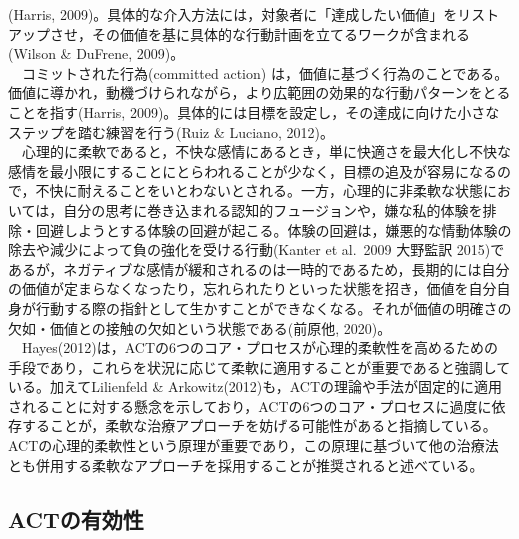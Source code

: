 \documentclass[12pt,a4paper,xelatex,ja=standard]{bxjsarticle}
\begin{document}
(Harris,
2009)。具体的な介入方法には，対象者に「達成したい価値」をリストアップさせ，その価値を基に具体的な行動計画を立てるワークが含まれる(Wilson
\& DuFrene, 2009)。\\
　コミットされた行為(committed action)
は，価値に基づく行為のことである。価値に導かれ，動機づけられながら，より広範囲の効果的な行動パターンをとることを指す(Harris,
2009)。具体的には目標を設定し，その達成に向けた小さなステップを踏む練習を行う(Ruiz
\& Luciano, 2012)。\\
　心理的に柔軟であると，不快な感情にあるとき，単に快適さを最大化し不快な感情を最小限にすることにとらわれることが少なく，目標の追及が容易になるので，不快に耐えることをいとわないとされる。一方，心理的に非柔軟な状態においては，自分の思考に巻き込まれる認知的フュージョンや，嫌な私的体験を排除・回避しようとする体験の回避が起こる。体験の回避は，嫌悪的な情動体験の除去や減少によって負の強化を受ける行動(Kanter
et al.~2009 大野監訳
2015)であるが，ネガティブな感情が緩和されるのは一時的であるため，長期的には自分の価値が定まらなくなったり，忘れられたりといった状態を招き，価値を自分自身が行動する際の指針として生かすことができなくなる。それが価値の明確さの欠如・価値との接触の欠如という状態である(前原他,
2020)。\\
　Hayes(2012)は，ACTの6つのコア・プロセスが心理的柔軟性を高めるための手段であり，これらを状況に応じて柔軟に適用することが重要であると強調している。加えてLilienfeld
\&
Arkowitz(2012)も，ACTの理論や手法が固定的に適用されることに対する懸念を示しており，ACTの6つのコア・プロセスに過度に依存することが，柔軟な治療アプローチを妨げる可能性があると指摘している。ACTの心理的柔軟性という原理が重要であり，この原理に基づいて他の治療法とも併用する柔軟なアプローチを採用することが推奨されると述べている。

\hypertarget{actux306eux6709ux52b9ux6027}{%
\subsection{ACTの有効性}\label{actux306eux6709ux52b9ux6027}}
\end{document}
